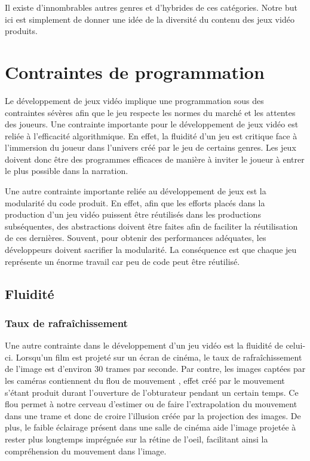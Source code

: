 \documentclass[12pt,twoside,letterpaper,francais]{book}
\begin{document}
Il existe d'innombrables autres genres et d'hybrides de ces
catégories. Notre but ici est simplement de donner une idée de la
diversité du contenu des jeux vidéo produits.


\FloatBarrier
\section{Contraintes de programmation}
Le dévelop\-pement de jeux vidéo implique une programmation sous des
contraintes sévères afin que le jeu respecte les normes du marché et
les attentes des joueurs. Une contrainte importante pour le
dévelop\-pement de jeux vidéo est reliée à l'efficacité
algorithmique. En effet, la fluidité d'un jeu est critique face à
l'immersion du joueur dans l'univers créé par le jeu de certains
genres. Les jeux doivent donc être des programmes efficaces de manière
à inviter le joueur à entrer le plus possible dans la narration.

Une autre contrainte importante reliée au dévelop\-pement de jeux est
la modularité du code produit. En effet, afin que les efforts placés
dans la production d'un jeu vidéo puissent être réutilisés dans les
productions subséquentes, des abstractions doivent être faites afin de
faciliter la réutilisation de ces dernières. Souvent, pour obtenir des
performances adéquates, les développeurs doivent sacrifier la
modularité. La conséquence est que chaque jeu représente un énorme
travail car peu de code peut être réutilisé.


\FloatBarrier
\subsection{Fluidité}
\subsubsection{Taux de rafraîchissement}
Une autre contrainte dans le dévelop\-pement d'un jeu vidéo est la
fluidité de celui-ci. Lorsqu'un film est projeté sur un écran de
cinéma, le taux de rafraîchissement de l'image est d'environ 30 trames
par seconde. Par contre, les images captées par les caméras
contiennent du \og flou de mouvement \fg, effet créé par le mouvement
s'étant produit durant l'ouverture de l'obturateur pendant un certain
temps. Ce flou permet à notre cerveau d'estimer ou de faire
l'extrapolation du mouvement dans une trame et donc de croire
l'illusion créée par la projection des images. De plus, le faible
éclairage présent dans une salle de cinéma aide l'image projetée à
rester plus longtemps imprégnée sur la rétine de l'oeil, facilitant
ainsi la compréhension du mouvement dans l'image.
\end{document}
